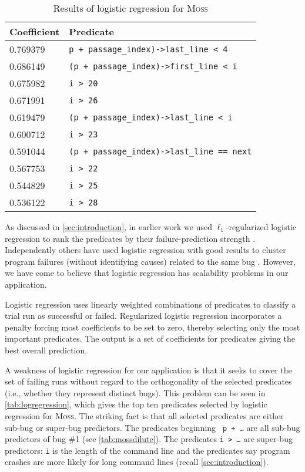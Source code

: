 \documentclass[draft]{sig-alternate}
\newcommand{\moss}{\textsc{Moss}\xspace}
\begin{document}
\begin{table}
\caption{Results of logistic regression for \moss}
\label{tab:logregression}
\centering
\small
\begin{tabular}{ll}
  \toprule
  Coefficient & Predicate \\
  \midrule
  0.769379 & \verb|p + passage_index)->last_line < 4| \\
  0.686149 & \verb|(p + passage_index)->first_line < i| \\
  0.675982 & \verb|i > 20| \\
  0.671991 & \verb|i > 26| \\
  0.619479 & \verb|(p + passage_index)->last_line < i| \\
  0.600712 & \verb|i > 23| \\
  0.591044 & \verb|(p + passage_index)->last_line == next| \\
  0.567753 & \verb|i > 22| \\
  0.544829 & \verb|i > 25| \\
  0.536122 & \verb|i > 28| \\
  \bottomrule
\end{tabular}
\end{table}

As discussed in \autoref{sec:introduction}, in earlier work 
we used $\ell_1$-regularized logistic regression
to rank the predicates by their
failure-prediction strength \cite{PLDI`03*141,NIPS2003_AP05}.  Independently others have used
logistic regression with good results to cluster program failures (without
identifying causes) related to the same bug \cite{ICSE`03*465}.  However, we have come
to believe that logistic regression has scalability problems in our application.

Logistic regression uses linearly weighted
combinations of predicates to classify a trial run as successful or
failed.  Regularized logistic regression incorporates a penalty
forcing most coefficients to be set to zero, thereby
selecting only the most important predicates.  The output is a set of
coefficients for predicates giving the best overall prediction.

A weakness of logistic regression for our application is that it seeks
to cover the set of failing runs without regard to the orthogonality
of the selected predicates (i.e., whether they represent distinct
bugs).  This problem can be seen in \autoref{tab:logregression},
which gives the top ten predicates selected by logistic regression
for \moss.  The striking fact is that all selected predicates are
either sub-bug or super-bug predictors.  The predicates beginning {\tt
p + \ldots} are all sub-bug predictors of bug \#1 (see
\autoref{tab:mossdilute}).  The predicates {\tt i > \ldots} are
super-bug predictors: {\tt i} is the length of the command line and
the predicates say program crashes are more likely for long command
lines (recall \autoref{sec:introduction}).
\end{document}
